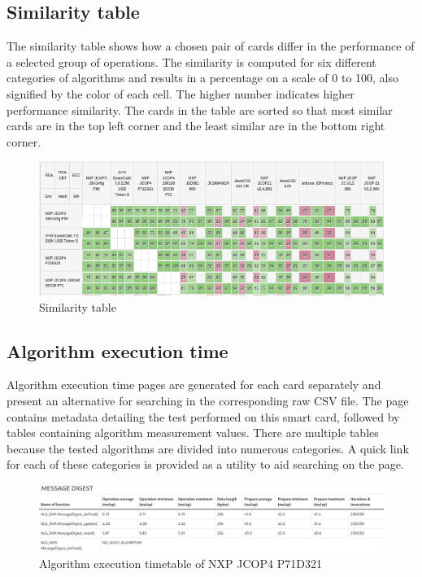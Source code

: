 \subsection{Similarity table}
The similarity table shows how a chosen pair of cards differ in the performance of a selected group of operations. The similarity is computed for six different categories of algorithms and results in a percentage on a scale of 0 to 100, also signified by the color of each cell. The higher number indicates higher performance similarity. The cards in the table are sorted so that most similar cards are in the top left corner and the least similar are in the bottom right corner.

\begin{figure}[H]
    \centering
    \includegraphics[width=\textwidth]{img/similarity-table.png}
    \caption{Similarity table}
    \label{fig:similarity-table}
\end{figure}

\subsection{Algorithm execution time}
Algorithm execution time pages are generated for each card separately and present an alternative for searching in the corresponding raw CSV file. The page contains metadata detailing the test performed on this smart card, followed by tables containing algorithm measurement values. There are multiple tables because the tested algorithms are divided into numerous categories. A quick link for each of these categories is provided as a utility to aid searching on the page.

\begin{figure}[H]
    \centering
    \includegraphics[width=\textwidth]{img/NXP JCOP4 P71D321 execution-time table.png}
    \caption{Algorithm execution timetable of NXP JCOP4 P71D321}
    \label{fig:execution-time-table}
\end{figure}

